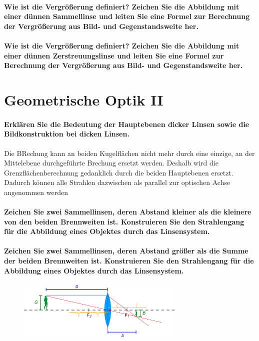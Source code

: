 \documentclass[a4paper, 11pt, ngerman, parskip=half]{scrartcl}
\begin{document}
\paragraph{Wie ist die Vergrößerung definiert? Zeichen Sie die Abbildung mit einer dünnen
Sammellinse und leiten Sie eine Formel zur Berechnung der Vergrößerung aus Bild- und
Gegenstandsweite her.}

\paragraph{Wie ist die Vergrößerung definiert? Zeichen Sie die Abbildung mit einer dünnen
Zerstreuungslinse und leiten Sie eine Formel zur Berechnung der Vergrößerung aus Bild- und
Gegenstandsweite her.}

\newpage

\section{Geometrische Optik II}

\paragraph{Erklären Sie die Bedeutung der Hauptebenen dicker Linsen sowie die Bildkonstruktion bei
dicken Linsen.}

Die BRechung kann an beiden Kugelflächen nicht mehr durch eine einzige, an der Mittelebene durchgeführte Brechung ersetzt werden. Deshalb wird die Grenzflächenberechnung gedanklich durch die beiden Hauptebenen ersetzt. Dadurch können alle Strahlen dazwischen als parallel zur optischen Achse angenommen werden

\paragraph{Zeichen Sie zwei Sammellinsen, deren Abstand kleiner als die kleinere von den beiden
Brennweiten ist. Konstruieren Sie den Strahlengang für die Abbildung eines Objektes durch
das Linsensystem.}

\paragraph{Zeichen Sie zwei Sammellinsen, deren Abstand größer als die Summe der beiden
Brennweiten ist. Konstruieren Sie den Strahlengang für die Abbildung eines Objektes durch
das Linsensystem.}

\begin{figure}[H]
    \centering
    \includegraphics[width=8cm]{image/18/geo22}
\end{figure}
\end{document}
